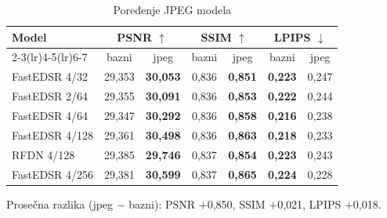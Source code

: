 \begin{table}[H]
    \begin{tabular}{lcccccc}
        \toprule
        Model & \multicolumn{2}{c}{PSNR $\uparrow$} & \multicolumn{2}{c}{SSIM $\uparrow$} & \multicolumn{2}{c}{LPIPS $\downarrow$} \\
        \cmidrule(lr){2-3}\cmidrule(lr){4-5}\cmidrule(lr){6-7}
         & bazni & jpeg & bazni & jpeg & bazni & jpeg \\
        \midrule
        FastEDSR 4/32 & 29,353 & \textbf{30,053} & 0,836 & \textbf{0,851} & \textbf{0,223} & 0,247 \\
        FastEDSR 2/64 & 29,355 & \textbf{30,091} & 0,836 & \textbf{0,853} & \textbf{0,222} & 0,244 \\
        FastEDSR 4/64 & 29,347 & \textbf{30,292} & 0,836 & \textbf{0,858} & \textbf{0,216} & 0,238 \\
        FastEDSR 4/128 & 29,361 & \textbf{30,498} & 0,836 & \textbf{0,863} & \textbf{0,218} & 0,233 \\
        RFDN 4/128 & 29,385 & \textbf{29,746} & 0,837 & \textbf{0,854} & \textbf{0,223} & 0,243 \\
        FastEDSR 4/256 & 29,381 & \textbf{30,599} & 0,837 & \textbf{0,865} & \textbf{0,224} & 0,228 \\
        \bottomrule
    \end{tabular}
    \caption{Poređenje JPEG modela}
    \label{tab:jpeg_DIV2K_jpeg80}
\end{table}

\noindent Prosečna razlika (jpeg $-$ bazni): PSNR $+$0,850, SSIM $+$0,021, LPIPS $+$0,018.